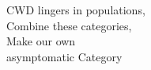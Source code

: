 \documentclass[preview]{standalone}
\begin{document}
\begin{center}
CWD lingers in populations,\\Combine these categories,\\Make our own\\asymptomatic Category
\end{center}
\end{document}
